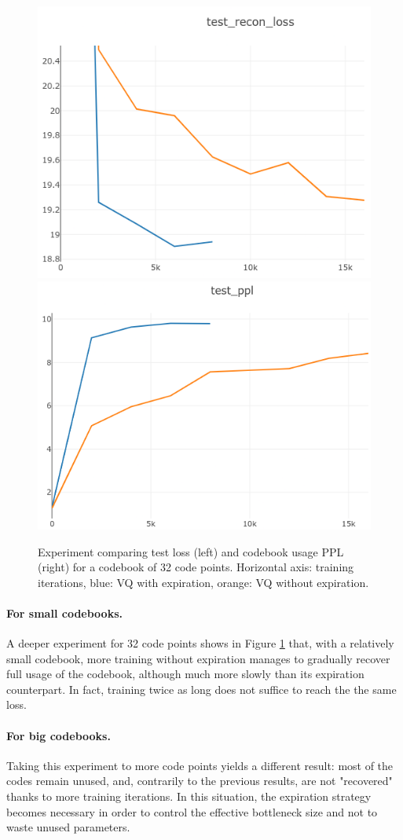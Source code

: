 \begin{figure}
    \centering
    \includegraphics[width=0.45\columnwidth]{60-files/loss-32.png}
    \includegraphics[width=0.45\columnwidth]{60-files/ppl-32.png}
    \caption{Experiment comparing test loss (left) and codebook usage \ac{PPL} (right) for a codebook of 32 code points. Horizontal axis: training iterations, blue: VQ with expiration, orange: VQ without expiration.}
    \label{fig:agingvq-32}
\end{figure}

\paragraph{For small codebooks.}
A deeper experiment for 32 code points shows in Figure \ref{fig:agingvq-32} that, with a relatively small codebook, more training without expiration manages to gradually recover full usage of the codebook, although much more slowly than its expiration counterpart. In fact, training twice as long does not suffice to reach the the same loss.

\paragraph{For big codebooks.}
Taking this experiment to more code points yields a different result: most of the codes remain unused, and, contrarily to the previous results, are not "recovered" thanks to more training iterations. In this situation, the expiration strategy becomes necessary in order to control the effective bottleneck size and not to waste unused parameters.

